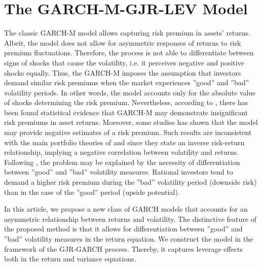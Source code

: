 \documentclass[authoryear, 1p]{elsarticle}
\numberwithin{equation}{section}
\begin{document}
\section{The GARCH-M-GJR-LEV Model} \label{Section4}

The classic GARCH-M model allows capturing risk premium in assets' returns. Albeit, the model does not allow for asymmetric responses of returns to risk premium fluctuations. Therefore, the process is not able to differentiate between signs of shocks that cause the volatility, i.e. it perceives negative and positive shocks equally. Thus, the GARCH-M imposes the assumption that investors demand similar risk premiums when the market experiences ''good'' and ''bad'' volatility periods. In other words, the model accounts only for the absolute value of shocks determining the risk premium.
Nevertheless, according to \citep{Bollerslev2022}, there has been found statistical evidence that GARCH-M may demonstrate insignificant risk premiums in asset returns. Moreover, some studies has shown that the model may provide negative estimates of a risk premium. Such results are inconsistent with the main portfolio theories of \citep{Markowitz1952} and
\citep{Sharpe1964} since they state an inverse risk-return relationship, implying a negative correlation between volatility and returns. Following \citep{Bollerslev2022}, the problem may be explained by the necessity of differentiation between ''good'' and ''bad'' volatility measures. Rational investors tend to demand a higher risk premium during the ''bad'' volatility period (downside risk) than in the case of the ''good'' period (upside potential).

In this article, we propose a new class of GARCH models that accounts for an asymmetric relationship between returns and volatility. The distinctive feature of the proposed method is that it allows for differentiation between ''good'' and ''bad'' volatility measures in the return equation.
We construct the model in the framework of the GJR-GARCH process. Thereby, it captures leverage effects both in the return and variance equations.
\end{document}
